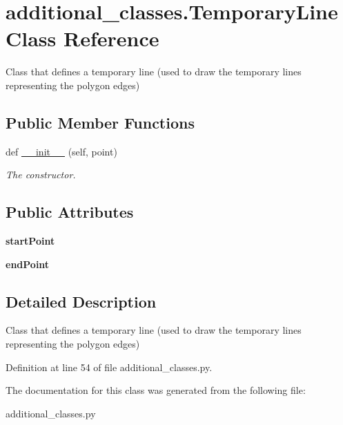 \hypertarget{classadditional__classes_1_1TemporaryLine}{}\section{additional\+\_\+classes.\+Temporary\+Line Class Reference}
\label{classadditional__classes_1_1TemporaryLine}


Class that defines a temporary line (used to draw the temporary lines representing the polygon edges)  


\subsection*{Public Member Functions}
\begin{DoxyCompactItemize}
\item 
\mbox{\label{classadditional__classes_1_1TemporaryLine_a5877e242c9aa50bdb7e97e343aad3d86}} 
def \hyperlink{classadditional__classes_1_1TemporaryLine_a5877e242c9aa50bdb7e97e343aad3d86}{\+\_\+\+\_\+init\+\_\+\+\_\+} (self, point)
\begin{DoxyCompactList}\small\item\em The constructor. \end{DoxyCompactList}\end{DoxyCompactItemize}
\subsection*{Public Attributes}
\begin{DoxyCompactItemize}
\item 
\mbox{\label{classadditional__classes_1_1TemporaryLine_adba70ff80ce45632da0995384bee8fdb}} 
{\bfseries start\+Point}
\item 
\mbox{\label{classadditional__classes_1_1TemporaryLine_a94c00c5880ba274d4fecfd43bc45b657}} 
{\bfseries end\+Point}
\end{DoxyCompactItemize}


\subsection{Detailed Description}
Class that defines a temporary line (used to draw the temporary lines representing the polygon edges) 

Definition at line 54 of file additional\+\_\+classes.\+py.



The documentation for this class was generated from the following file\+:\begin{DoxyCompactItemize}
\item 
additional\+\_\+classes.\+py\end{DoxyCompactItemize}
